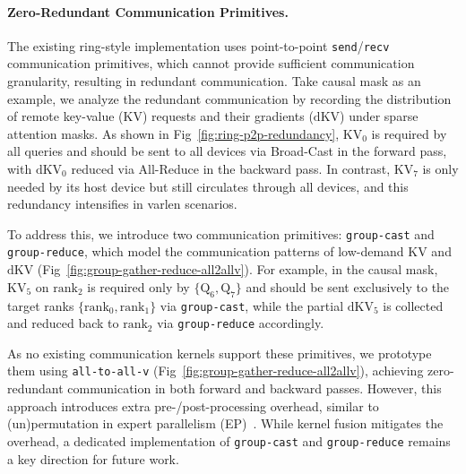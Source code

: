 \paragraph{Zero-Redundant Communication Primitives.}\label{sec:magiattn_comm}



The existing ring-style implementation uses point-to-point \texttt{send}/\texttt{recv} communication primitives, which cannot provide sufficient communication granularity, resulting in redundant communication. Take causal mask as an example, we analyze the redundant communication by recording the distribution of remote key-value ($\mathrm{KV}$) requests and their gradients ($\mathrm{dKV}$) under sparse attention masks. As shown in Fig~\ref{fig:ring-p2p-redundancy}, $\mathrm{KV}_0$ is required by all queries and should be sent to all devices via Broad-Cast in the forward pass, with $\mathrm{dKV}_0$ reduced via All-Reduce in the backward pass. In contrast, $\mathrm{KV}_7$ is only needed by its host device but still circulates through all devices, and this redundancy intensifies in varlen scenarios.



To address this, we introduce two communication primitives: \texttt{group-cast} and \texttt{group-reduce}, which model the communication patterns of low-demand $\mathrm{KV}$ and $\mathrm{dKV}$ (Fig~\ref{fig:group-gather-reduce-all2allv}). For example, in the causal mask, $\mathrm{KV}_5$ on $\mathrm{rank}_2$ is required only by $\{\mathrm{Q}_6,\mathrm{Q}_7\}$ and should be sent exclusively to the target ranks $\{\mathrm{rank}_0, \mathrm{rank}_1\}$ via \texttt{group-cast}, while the partial $\mathrm{dKV}_5$ is collected and reduced back to $\mathrm{rank}_2$ via \texttt{group-reduce} accordingly.

As no existing communication kernels support these primitives, we prototype them using \texttt{all-to-all-v} (Fig~\ref{fig:group-gather-reduce-all2allv}), achieving zero-redundant communication in both forward and backward passes. However, this approach introduces extra pre-/post-processing overhead, similar to (un)permutation in expert parallelism (EP)~\citep{gale2022megablocks}. While kernel fusion mitigates the overhead, a dedicated implementation of \texttt{group-cast} and \texttt{group-reduce} remains a key direction for future work.









